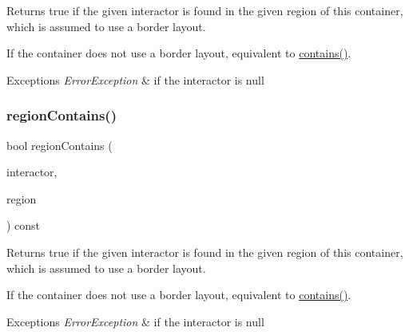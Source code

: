 Returns true if the given interactor is found in the given region of this container, which is assumed to use a border layout. 

If the container does not use a border layout, equivalent to \mbox{\hyperlink{classsgl_1_1GContainer_a29e67f98cd36414c67475b8941d861a6}{contains()}}. 
\begin{DoxyExceptions}{Exceptions}
{\em Error\+Exception} & if the interactor is null \\
\hline
\end{DoxyExceptions}
\mbox{\label{classsgl_1_1GContainer_a84a56bae6b8883d27e44d51c31b2bfc5}} 
\subsubsection{\texorpdfstring{region\+Contains()}{regionContains()}\hspace{0.1cm}{\footnotesize\ttfamily [2/4]}}
{\footnotesize\ttfamily bool region\+Contains (\begin{DoxyParamCaption}\item[{\mbox{\hyperlink{classsgl_1_1GInteractor}{G\+Interactor}} $\ast$}]{interactor,  }\item[{const std\+::string \&}]{region }\end{DoxyParamCaption}) const\hspace{0.3cm}{\ttfamily [virtual]}}



Returns true if the given interactor is found in the given region of this container, which is assumed to use a border layout. 

If the container does not use a border layout, equivalent to \mbox{\hyperlink{classsgl_1_1GContainer_a29e67f98cd36414c67475b8941d861a6}{contains()}}. 
\begin{DoxyExceptions}{Exceptions}
{\em Error\+Exception} & if the interactor is null \\
\hline
\end{DoxyExceptions}
\mbox{\label{classsgl_1_1GContainer_aa4cf95952747fd421a2b005eedbc662c}} 
